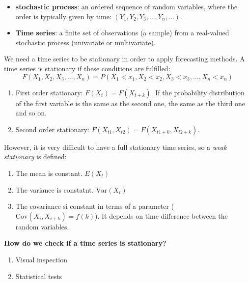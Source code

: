\begin{itemize}
    \item \textbf{stochastic process}: an ordered sequence of random variables, where the
    order is typically given by time: $(Y_1, Y_2, Y_3, \dots, Y_n, \dots)$.
    \item \textbf{Time series}: a finite set of observations (a sample) from a real-valued
    stochastic process (univariate or multivariate).
\end{itemize}

We need a time series to be stationary in order to apply forecasting methods. A time series is stationary if these conditions are fulfilled:
$$
F(X_1, X_2, X_3, \dots, X_n) = P(X_1 < x_1, X_2 < x_2, X_3 < x_3, \dots, X_n < x_n)
$$
\begin{enumerate}
    \item First order stationary: $F(X_t) = F(X_{t +k})$. If the probability distribution of the first variable is the same as the second one, the same as the third one and so on.
    \item Second order stationary: $F(X_{t1}, X_{t2}) = F(X_{t1 + k}, X_{t2 + k})$.
\end{enumerate}

However, it is very difficult to have a full stationary time series, so a \textit{weak stationary} is defined:
\begin{enumerate}
    \item The mean is constant. $E(X_t)$
    \item The variance is constatnt. $\text{Var}(X_t)$
    \item The covariance si constant in terms of a parameter ($\text{Cov}(X_i, X_{i+k})=f(k)$). It depends on time difference between the random variables.
\end{enumerate}

\textbf{How do we check if a time series is stationary?}
\begin{enumerate}
    \item Visual inspection
    \item Statistical tests
\end{enumerate}

